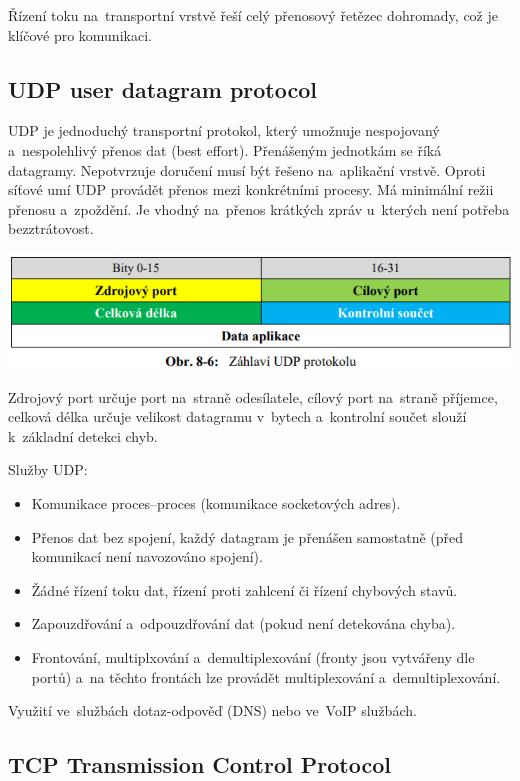 Řízení toku  na~transportní vrstvě řeší celý přenosový řetězec dohromady, což je klíčové pro komunikaci.


\subsection{UDP user datagram protocol}

UDP je jednoduchý transportní protokol, který umožnuje nespojovaný a~nespolehlivý přenos dat (best effort). Přenášeným jednotkám se říká datagramy. Nepotvrzuje doručení musí být řešeno na~aplikační vrstvě. Oproti síťové umí UDP provádět přenos mezi konkrétními procesy. Má minimální režii přenosu a~zpoždění. Je vhodný na~přenos krátkých zpráv u~kterých není potřeba bezztrátovost.

\begin{center}
\includegraphics[scale = 0.5]{images/-050.png}
\end{center}

Zdrojový port určuje port na~straně odesílatele, cílový port na~straně příjemce, celková délka určuje velikost datagramu v~bytech a~kontrolní součet slouží k~základní detekci chyb.

Služby UDP:
\begin{itemize}[noitemsep]
    \item Komunikace proces--proces (komunikace socketových adres).
    \item Přenos dat bez spojení, každý datagram je přenášen samostatně (před komunikací není navozováno spojení).
    \item Žádné řízení toku dat, řízení proti zahlcení či řízení chybových stavů.
    \item Zapouzdřování a~odpouzdřování dat (pokud není detekována chyba).
    \item Frontování, multiplxování a~demultiplexování (fronty jsou vytvářeny dle portů) a~na těchto frontách lze provádět multiplexování a~demultiplexování.
\end{itemize}

Využití ve~službách dotaz-odpověď (DNS) nebo ve~VoIP službách.

\subsection{TCP Transmission Control Protocol}

